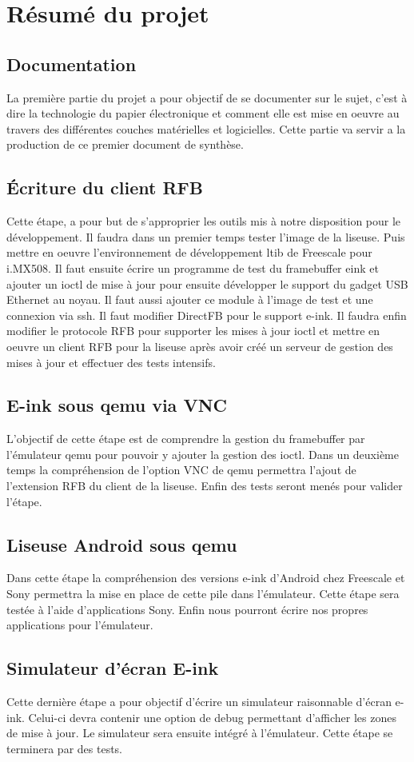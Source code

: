 \chapter{Résumé du projet}
\section{Documentation}
La première partie du projet a pour objectif de se documenter sur le sujet, c'est à dire la technologie du papier électronique et comment elle est mise en oeuvre au travers des différentes couches matérielles et logicielles.
Cette partie va servir a la production de ce premier document de synthèse. 
\section{Écriture du client RFB}
Cette étape, a pour but de s'approprier les outils mis à notre disposition pour le développement. Il faudra dans un premier temps tester l'image de la liseuse. Puis mettre en oeuvre l'environnement de développement ltib de Freescale pour i.MX508. Il faut ensuite écrire un programme de test du framebuffer eink et ajouter un ioctl de mise à jour pour ensuite développer le support du gadget USB Ethernet au noyau. Il faut aussi ajouter ce module à l'image de test et une connexion via ssh. Il faut modifier DirectFB pour le support e-ink. Il faudra enfin modifier le protocole RFB pour supporter les mises à jour ioctl et mettre en oeuvre un client RFB pour la liseuse après avoir créé un serveur de gestion des mises à jour et effectuer des tests intensifs.
\section{E-ink sous qemu via VNC}
L'objectif de cette étape est de comprendre la gestion du framebuffer par l'émulateur qemu pour pouvoir y ajouter la gestion des ioctl. Dans un deuxième temps la compréhension de l'option VNC de qemu permettra l'ajout de l'extension RFB du client de la liseuse. Enfin des tests seront menés pour valider l'étape.
\section{Liseuse Android sous qemu}
Dans cette étape la compréhension des versions e-ink d'Android chez Freescale et Sony permettra la mise en place de cette pile dans l'émulateur. Cette étape sera testée à l'aide d'applications Sony. Enfin nous pourront écrire nos propres applications pour l'émulateur.
\section{Simulateur d'écran E-ink}
Cette dernière étape a pour objectif d'écrire un simulateur raisonnable d'écran e-ink. Celui-ci devra contenir une option de debug permettant d'afficher les zones de mise à jour. Le simulateur sera ensuite intégré à l'émulateur. Cette étape se terminera par des tests.